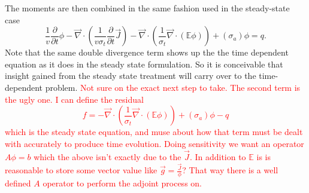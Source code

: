 \documentclass[12pt]{report}
\renewcommand{\div}{\vec{\nabla} \cdot}
\newcommand{\Edd}{\mathbb{E}}
\newcommand{\sigt}{\sigma_t}
\newcommand{\siga}{\sigma_a}
\newcommand{\scalSource}{q}
\newcommand{\comment}[2]{\marginpar{\textcolor{#2}{$\star$}}\textcolor{#2}{#1}\newline}
\newcommand{\iwh}[1]{\comment{#1}{red}}
\newcommand{\iwh}[1]{\phantom{a}}
\begin{document}
\begin{appendices}
\begin{subequations}
%
\end{subequations}
The moments are then combined in the same fashion used in the steady-state case
\begin{equation}
\label{VETTrans}
\frac{1}{v} \frac{\partial}{\partial t}\phi - \div \left( \frac{1}{v \sigt} \frac{\partial}{\partial t}\vec{J} \right)   - \div \left( \frac{1}{\sigt} \div \left( \Edd \phi \right) \right)  + (\siga) \phi = \scalSource.
\end{equation}
Note that the same double divergence term shows up the the time dependent equation as it does in the steady state formulation. So it is conceivable that insight gained from the steady state treatment will carry over to the time-dependent problem. 
\iwh{Not sure on the exact next step to take. The second term is the ugly one. I can define the residual 
\begin{equation}
f=- \div \left( \frac{1}{\sigt} \div \left( \Edd \phi \right) \right)  + (\siga) \phi - \scalSource
\end{equation}
which is the steady state equation, and muse about how that term must be dealt with accurately to produce time evolution. 
Doing sensitivity we want an operator $A \phi = b$ which the above isn't exactly due to the $\vec{J}$. In addition to $\Edd$ is is reasonable to store some vector value like $\vec{g}=\frac{\vec{J}}{\phi}$? That way there is a well defined $A$ operator to perform the adjoint process on.}


\end{appendices}
\end{document}
